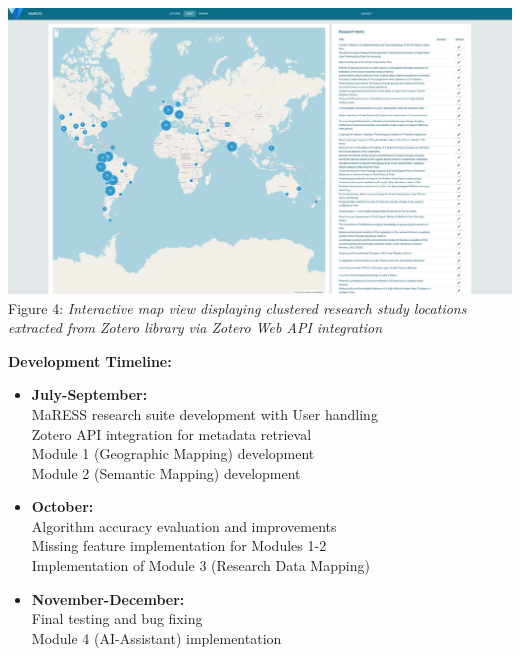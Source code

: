 \documentclass[a0,portrait]{a0poster}
\begin{document}
\begin{multicols}{3}
	\begin{center}
		\includegraphics[width=0.9\linewidth]{map-view}\\
		\vspace{0.2cm}
		{\small Figure 4: \textit{Interactive map view displaying clustered research study locations extracted from Zotero
				library via Zotero Web API integration}}
	\end{center}

	\vspace{0.5cm}
	\begin{tcolorbox}[mainbox, title={\Large\textbf{Current Status \& Future Development}}]
		\vspace{0.5cm}
		\textbf{Development Timeline:}
		\begin{itemize}[leftmargin=*]
			\item \textbf{July-September:}
			      \\MaRESS research suite development with User handling
			      \\Zotero API integration for metadata retrieval
			      \\Module 1 (Geographic Mapping) development
			      \\Module 2 (Semantic Mapping) development

			\item \textbf{October:}
			      \\Algorithm accuracy evaluation and improvements
			      \\Missing feature implementation for Modules 1{-}2
			      \\ Implementation of Module 3 (Research Data Mapping)
			\item \textbf{November-December:}
			      \\Final testing and bug fixing
			      \\Module 4 (AI-Assistant) implementation
		\end{itemize}


\end{tcolorbox}
\end{multicols}
\end{document}
